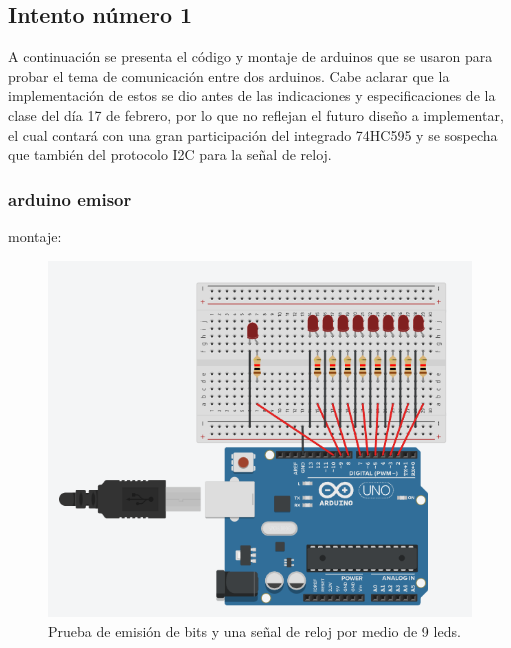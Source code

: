 \documentclass{article}
\begin{document}
\subsection{Intento número 1}\label{intento1}
A continuación se presenta el código y montaje de arduinos que se usaron para probar el tema de comunicación entre dos arduinos. Cabe aclarar que la implementación de estos se dio antes de las indicaciones y especificaciones de la clase del día 17 de febrero, por lo que no reflejan el futuro diseño a implementar, el cual contará con una gran participación del integrado 74HC595 y se sospecha que también del protocolo I2C para la señal de reloj.

\subsubsection{arduino emisor}\label{intento1}

montaje:
\begin{figure}[h]
\includegraphics[scale=0.6]{emisor1.png}
\centering
\caption{Prueba de emisión de bits y una señal de reloj por medio de 9 leds.}
\label{fig:emisor1}
\end{figure}
\end{document}
